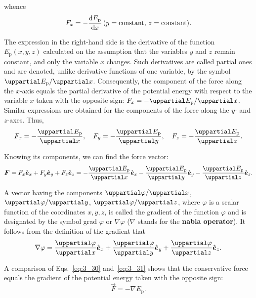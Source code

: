 \noindent
whence
\begin{equation*}
F_x = -\frac{\mathrm{d} E_{\text{p}}}{\mathrm{d} x}\, (y=\text{constant},\, z=\text{constant}).
\end{equation*}

\noindent
The expression in the right-hand side is the derivative of the function $E_{\text{p}}(x,y,z)$ calculated on the assumption that the variables $y$ and $z$ remain constant, and only the variable $x$ changes. Such derivatives are called partial ones and are denoted, unlike derivative functions of one variable, by the symbol $\diffinpartial{E_{\text{p}}}{x}$. Consequently, the component of the force along the $x$-axis equals the partial derivative of the potential energy with respect to the variable $x$ taken with the opposite sign: $F_x=-\diffinpartial{E_{\text{p}}}{x}$. Similar expressions are obtained for the components of the force along the $y$- and $z$-axes. Thus,
\begin{equation}\label{eq:3_29}
F_x = -\diffpartial{E_{\text{p}}}{x},\quad F_y = -\diffpartial{E_{\text{p}}}{y},\quad F_z = -\diffpartial{E_{\text{p}}}{z}.
\end{equation}

Knowing its components, we can find the force vector:
\begin{equation}\label{eq:3_30}
\vec{F} = F_x\vecuni{x} + F_y\vecuni{y} + F_z\vecuni{z} =
-\diffpartial{E_{\text{p}}}{x}\vecuni{x} - \diffpartial{E_{\text{p}}}{y}\vecuni{y} -\diffpartial{E_{\text{p}}}{z}\vecuni{z}.
\end{equation}

A vector having the components $\diffinpartial{\varphi}{x}$,  $\diffinpartial{\varphi}{y}$, $\diffinpartial{\varphi}{z}$, where $\varphi$ is a scalar function of the coordinates $x,y,z$, is called the gradient of the function $\varphi$ and is designated by the symbol grad $\varphi$ or $\nabla\varphi$ ($\nabla$ stands for the \textbf{nabla operator}). It follows from the definition of the gradient that
\begin{equation}\label{eq:3_31}
\nabla\varphi = \diffpartial{\varphi}{x}\vecuni{x} + \diffpartial{\varphi}{y}\vecuni{y} + \diffpartial{\varphi}{z}\vecuni{z}.
\end{equation}

A comparison of Eqs.~\eqref{eq:3_30} and~\eqref{eq:3_31} shows that the conservative force equals the gradient of the potential energy taken with the opposite sign:
\begin{equation}\label{eq:3_32}
\vec{F} = -\nabla E_{\text{p}}.
\end{equation}

